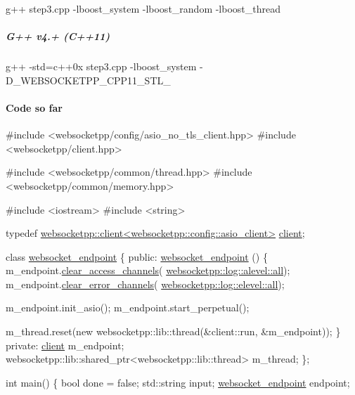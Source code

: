 {\ttfamily g++ step3.\+cpp -\/lboost\+\_\+system -\/lboost\+\_\+random -\/lboost\+\_\+thread}

\subparagraph*{G++ v4.+ (C++11)}

{\ttfamily g++ -\/std=c++0x step3.\+cpp -\/lboost\+\_\+system -\/\+D\+\_\+\+W\+E\+B\+S\+O\+C\+K\+E\+T\+P\+P\+\_\+\+C\+P\+P11\+\_\+\+S\+T\+L\+\_\+}

\paragraph*{Code so far}


\begin{DoxyCode}
\textcolor{preprocessor}{#include <websocketpp/config/asio\_no\_tls\_client.hpp>}
\textcolor{preprocessor}{#include <websocketpp/client.hpp>}

\textcolor{preprocessor}{#include <websocketpp/common/thread.hpp>}
\textcolor{preprocessor}{#include <websocketpp/common/memory.hpp>}

\textcolor{preprocessor}{#include <iostream>}
\textcolor{preprocessor}{#include <string>}

\textcolor{keyword}{typedef} \mbox{\hyperlink{classwebsocketpp_1_1client}{websocketpp::client<websocketpp::config::asio\_client>}}
       \mbox{\hyperlink{classwebsocketpp_1_1client}{client}};

\textcolor{keyword}{class }\mbox{\hyperlink{classwebsocket__endpoint}{websocket\_endpoint}} \{
\textcolor{keyword}{public}:
    \mbox{\hyperlink{classwebsocket__endpoint}{websocket\_endpoint}} () \{
        m\_endpoint.\mbox{\hyperlink{classwebsocketpp_1_1endpoint_a3fe357b3c6434273a9965eb52902575d}{clear\_access\_channels}}(
      \mbox{\hyperlink{structwebsocketpp_1_1log_1_1alevel_a853aa0b8976e53f3181af3bc398d493e}{websocketpp::log::alevel::all}});
        m\_endpoint.\mbox{\hyperlink{classwebsocketpp_1_1endpoint_a8cefa4fc37c0df4eb6ed0bcf04bb0da5}{clear\_error\_channels}}(
      \mbox{\hyperlink{structwebsocketpp_1_1log_1_1elevel_a9b31ff708c221d314f9f4eb3ff2b1ad7}{websocketpp::log::elevel::all}});

        m\_endpoint.init\_asio();
        m\_endpoint.start\_perpetual();

        m\_thread.reset(\textcolor{keyword}{new} websocketpp::lib::thread(&client::run, &m\_endpoint));
    \}
\textcolor{keyword}{private}:
    \mbox{\hyperlink{classwebsocketpp_1_1client}{client}} m\_endpoint;
    websocketpp::lib::shared\_ptr<websocketpp::lib::thread> m\_thread;
\};

\textcolor{keywordtype}{int} main() \{
    \textcolor{keywordtype}{bool} done = \textcolor{keyword}{false};
    std::string input;
    \mbox{\hyperlink{classwebsocket__endpoint}{websocket\_endpoint}} endpoint;


\end{DoxyCode}
